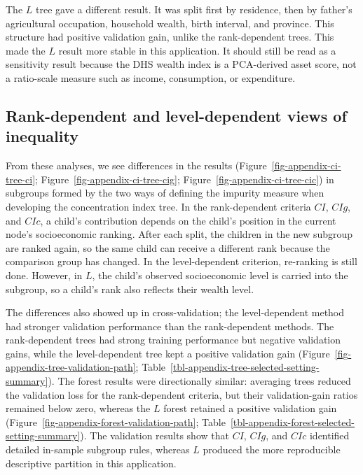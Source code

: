 \documentclass[
  11pt,
  a4paper,
]{article}
\begin{document}
The \(L\) tree gave a different result. It was split first by residence,
then by father's agricultural occupation, household wealth, birth
interval, and province. This structure had positive validation gain,
unlike the rank-dependent trees. This made the \(L\) result more stable
in this application. It should still be read as a sensitivity result
because the DHS wealth index is a PCA-derived asset score, not a
ratio-scale measure such as income, consumption, or expenditure.

\subsection{Rank-dependent and level-dependent views of
inequality}\label{rank-dependent-and-level-dependent-views-of-inequality}

From these analyses, we see differences in the results
(Figure~\ref{fig-appendix-ci-tree-ci};
Figure~\ref{fig-appendix-ci-tree-cig};
Figure~\ref{fig-appendix-ci-tree-cic}) in subgroups formed by the two
ways of defining the impurity measure when developing the concentration
index tree. In the rank-dependent criteria \(CI\), \(CIg\), and \(CIc\),
a child's contribution depends on the child's position in the current
node's socioeconomic ranking. After each split, the children in the new
subgroup are ranked again, so the same child can receive a different
rank because the comparison group has changed. In the level-dependent
criterion, re-ranking is still done. However, in \(L\), the child's
observed socioeconomic level is carried into the subgroup, so a child's
rank also reflects their wealth level.

The differences also showed up in cross-validation; the level-dependent
method had stronger validation performance than the rank-dependent
methods. The rank-dependent trees had strong training performance but
negative validation gains, while the level-dependent tree kept a
positive validation gain
(Figure~\ref{fig-appendix-tree-validation-path};
Table~\ref{tbl-appendix-tree-selected-setting-summary}). The forest
results were directionally similar: averaging trees reduced the
validation loss for the rank-dependent criteria, but their
validation-gain ratios remained below zero, whereas the \(L\) forest
retained a positive validation gain
(Figure~\ref{fig-appendix-forest-validation-path};
Table~\ref{tbl-appendix-forest-selected-setting-summary}). The
validation results show that \(CI\), \(CIg\), and \(CIc\) identified
detailed in-sample subgroup rules, whereas \(L\) produced the more
reproducible descriptive partition in this application.
\end{document}
